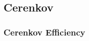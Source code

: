 \subsection{\label{sec:calib.cc}Cerenkov}

\subsubsection{\label{sec:calib.cc.eff}Cerenkov Efficiency}

\FloatBarrier
